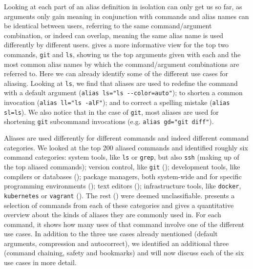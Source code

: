 Looking at each part of an alias definition in isolation can only get us so far, as arguments only gain meaning in conjunction with commands and alias names can be identical between users, referring to the same command/argument combination, or indeed can overlap, meaning the same alias name is used differently by different users.
 gives a more informative view for the top two commands, \texttt{git} and \texttt{ls}, showing us the top arguments given with each and the most common alias names by which the command/argument combinations are referred to.
Here we can already identify some of the different use cases for aliasing.
Looking at \texttt{ls}, we find that aliases are used 
to redefine the command with a default argument (\verb|alias ls="ls --color=auto"|);
to shorten a common invocation (\verb|alias ll="ls -alF"|);
and to correct a spelling mistake (\verb|alias sl=ls|).
We also notice that in the case of \texttt{git}, most aliases are used for shortening \texttt{git} subcommand invocations (e.g. \verb|alias gd="git diff"|).



Aliases are used differently for different commands and indeed different command categories.
We looked at the top 200 aliased commands and identified roughly six command categories: system tools, like \texttt{ls} or \texttt{grep}, but also \texttt{ssh} (making up  of the top aliased commands); version control, like \texttt{git} (); development tools, like compilers or databases (); package managers, both system-wide and for specific programming environments (); text editors (); infrastructure tools, like \texttt{docker}, \texttt{kubernetes} or \texttt{vagrant} (). The rest () were deemed unclassifiable.
 presents a selection of commands from each of these categories and gives a quantitative overview about the kinds of aliases they are commonly used in.
For each command, it shows how many uses of that command involve one of the different use cases.
In addition to the three use cases already mentioned (default arguments, compression and autocorrect), we identified an additional three (command chaining, safety and bookmarks) and will now discuss each of the six use cases in more detail.


